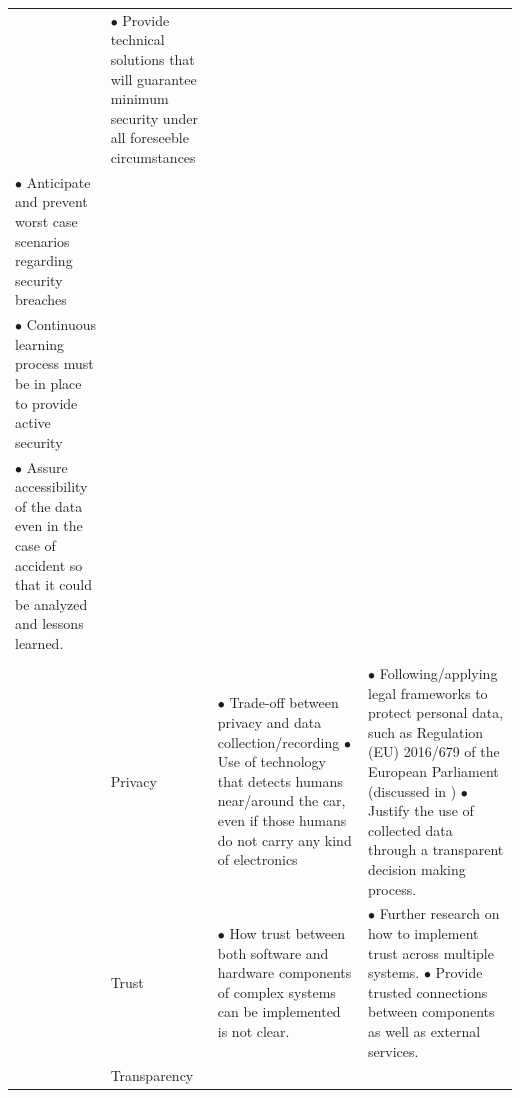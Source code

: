 \begin{table}
\begin{small}
\begin{supertabular}{>{}p{.02\textwidth}|>{\raggedright}p{.105\textwidth}>{\raggedright}p{.4\textwidth}>{\raggedright}p{.4\textwidth}}
			& 
					\noindent $\bullet$ Provide technical solutions that will guarantee minimum security under all foreseeble circumstances\\
					\noindent $\bullet$ Anticipate and prevent worst case scenarios regarding security breaches\\
					\noindent $\bullet$ Continuous learning process must be in place to provide active security\\
					\noindent $\bullet$ Assure accessibility of the data even in the case of accident so that it could be analyzed and lessons learned.\\
					  
 		     \tabularnewline {}
			& Privacy & 
				\vspace{-8pt}
				\noindent $\bullet$ Trade-off between privacy and data collection/recording
				\noindent $\bullet$ Use of technology that detects humans near/around the car, even if those humans do not carry any kind of electronics  
			& 
				\vspace{-8pt}
				\noindent $\bullet$ Following/applying legal frameworks to protect personal data, such as Regulation (EU) 2016/679 of the European Parliament \cite{EuropeanUnion2016} (discussed in \cite{doi:10.1093/idpl/ipx005})
				\noindent $\bullet$ Justify the use of collected data through a transparent decision making process.
 			 \tabularnewline {}
			& Trust & 
				\noindent $\bullet$ How trust between both software and hardware components of complex systems can be implemented is not clear.
			& 
				\noindent $\bullet$ Further research on how to implement trust across multiple systems. 
				\noindent $\bullet$ Provide trusted connections between components as well as external services.
 			 \tabularnewline {}
			& Transparency & 
				

\end{supertabular}
\end{small}
\end{table}
